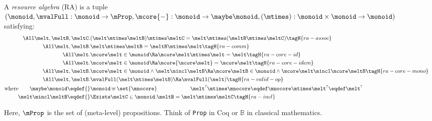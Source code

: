 \begin{defn}
  A \emph{resource algebra} (RA) is a tuple \\
  $(\monoid, \mvalFull :  \monoid \to \mProp, \mcore{{-}}:
  \monoid \to \maybe\monoid, (\mtimes) : \monoid \times \monoid \to \monoid)$ satisfying:
  \begin{align*}
    \All \melt, \meltB, \meltC.& (\melt \mtimes \meltB) \mtimes \meltC = \melt \mtimes (\meltB \mtimes \meltC) \tagH{ra-assoc} \\
    \All \melt, \meltB.& \melt \mtimes \meltB = \meltB \mtimes \melt \tagH{ra-comm} \\
    \All \melt.& \mcore\melt \in \monoid \Ra \mcore\melt \mtimes \melt = \melt \tagH{ra-core-id} \\
    \All \melt.& \mcore\melt \in \monoid \Ra \mcore{\mcore\melt} = \mcore\melt \tagH{ra-core-idem} \\
    \All \melt, \meltB.& \mcore\melt \in \monoid \land \melt \mincl \meltB \Ra \mcore\meltB \in \monoid \land \mcore\melt \mincl \mcore\meltB \tagH{ra-core-mono} \\
    \All \melt, \meltB.& \mvalFull(\melt \mtimes \meltB)  \Ra \mvalFull(\melt)  \tagH{ra-valid-op} \\
    \text{where}\qquad %
    \maybe\monoid \eqdef{}& \monoid \uplus \set{\mnocore} \qquad\qquad\qquad \melt^? \mtimes \mnocore \eqdef \mnocore \mtimes \melt^? \eqdef \melt^? \\
    \melt \mincl \meltB \eqdef{}& \Exists \meltC \in \monoid. \meltB = \melt \mtimes \meltC \tagH{ra-incl}
  \end{align*}
\end{defn}
Here, $\mProp$ is the set of (meta-level) propositions.
Think of \texttt{Prop} in Coq or $\mathbb{B}$ in classical mathematics.

